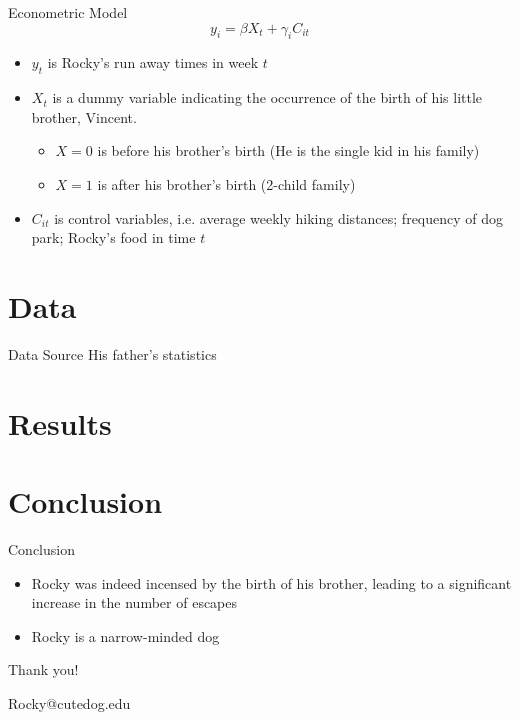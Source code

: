 \documentclass[10pt, xcolor=x11names,compress]{beamer}
\begin{document}
\begin{frame}{Econometric Model}
$$
y_{i}=\beta X_{t}+\gamma_{i} C_{it}
$$
\begin{itemize}
 \item $y_{t}$ is Rocky's run away times in week $t$
 \item $X_{t}$ is a dummy variable indicating the occurrence of the birth of his little brother, Vincent.
    \begin{itemize}
        \item $X=0$ is before his brother's birth (He is the single kid in his family)
        \item $X=1$ is after his brother's birth (2-child family)
    \end{itemize}
 \item $C_{i t}$ is control variables, i.e. average weekly hiking distances; frequency of dog park; Rocky's food in time $t$ 

\end{itemize}
\end{frame}


\section{Data}
\begin{frame}{Data Source}
His father's statistics
   
\end{frame}

\section{Results}

\section{Conclusion}
\begin{frame}{Conclusion}
\begin{itemize}
    \item Rocky was indeed incensed by the birth of his brother, leading to a significant increase in the number of escapes
    \item  Rocky is a narrow-minded dog
\end{itemize}
    
\end{frame}


\begin{frame}
 \begin{center}
		{\Huge Thank you!}\\
		\bigskip\bigskip %
		
		{\LARGE Rocky@cutedog.edu}
		
	\end{center}
\end{frame}
\end{document}
